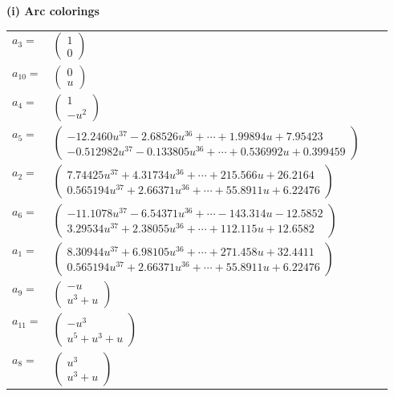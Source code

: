 \documentclass[1p]{elsarticle_modified}
\theoremstyle{definition}
\begin{document}
\flushleft \textbf{(i) Arc colorings}\\
\begin{tabular}{m{7pt} m{180pt} m{7pt} m{180pt} }
\flushright $a_{3}=$&$\begin{pmatrix}1\\0\end{pmatrix}$ \\
\flushright $a_{10}=$&$\begin{pmatrix}0\\u\end{pmatrix}$ \\
\flushright $a_{4}=$&$\begin{pmatrix}1\\- u^2\end{pmatrix}$ \\
\flushright $a_{5}=$&$\begin{pmatrix}-12.2460 u^{37}-2.68526 u^{36}+\cdots+1.99894 u+7.95423\\-0.512982 u^{37}-0.133805 u^{36}+\cdots+0.536992 u+0.399459\end{pmatrix}$ \\
\flushright $a_{2}=$&$\begin{pmatrix}7.74425 u^{37}+4.31734 u^{36}+\cdots+215.566 u+26.2164\\0.565194 u^{37}+2.66371 u^{36}+\cdots+55.8911 u+6.22476\end{pmatrix}$ \\
\flushright $a_{6}=$&$\begin{pmatrix}-11.1078 u^{37}-6.54371 u^{36}+\cdots-143.314 u-12.5852\\3.29534 u^{37}+2.38055 u^{36}+\cdots+112.115 u+12.6582\end{pmatrix}$ \\
\flushright $a_{1}=$&$\begin{pmatrix}8.30944 u^{37}+6.98105 u^{36}+\cdots+271.458 u+32.4411\\0.565194 u^{37}+2.66371 u^{36}+\cdots+55.8911 u+6.22476\end{pmatrix}$ \\
\flushright $a_{9}=$&$\begin{pmatrix}- u\\u^3+u\end{pmatrix}$ \\
\flushright $a_{11}=$&$\begin{pmatrix}- u^3\\u^5+u^3+u\end{pmatrix}$ \\
\flushright $a_{8}=$&$\begin{pmatrix}u^3\\u^3+u\end{pmatrix}$ \\

\end{tabular}
\end{document}
